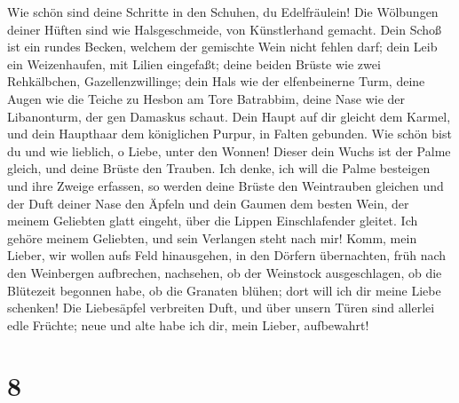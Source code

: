  Wie schön sind deine Schritte in den Schuhen, du
Edelfräulein! Die Wölbungen deiner Hüften sind wie Halsgeschmeide, von
Künstlerhand gemacht.  Dein Schoß ist ein rundes Becken,
welchem der gemischte Wein nicht fehlen darf; dein Leib ein
Weizenhaufen, mit Lilien eingefaßt;  deine beiden Brüste
wie zwei Rehkälbchen, Gazellenzwillinge;  dein Hals wie
der elfenbeinerne Turm, deine Augen wie die Teiche zu Hesbon am Tore
Batrabbim, deine Nase wie der Libanonturm, der gen Damaskus schaut.
 Dein Haupt auf dir gleicht dem Karmel, und dein Haupthaar
dem königlichen Purpur, in Falten gebunden.  Wie schön
bist du und wie lieblich, o Liebe, unter den Wonnen! 
Dieser dein Wuchs ist der Palme gleich, und deine Brüste den Trauben.
 Ich denke, ich will die Palme besteigen und ihre Zweige
erfassen, so werden deine Brüste den Weintrauben gleichen und der Duft
deiner Nase den Äpfeln  und dein Gaumen dem besten Wein,
der meinem Geliebten glatt eingeht, über die Lippen Einschlafender
gleitet.  Ich gehöre meinem Geliebten, und sein Verlangen
steht nach mir!  Komm, mein Lieber, wir wollen aufs Feld
hinausgehen, in den Dörfern übernachten,  früh nach den
Weinbergen aufbrechen, nachsehen, ob der Weinstock ausgeschlagen, ob die
Blütezeit begonnen habe, ob die Granaten blühen; dort will ich dir meine
Liebe schenken!  Die Liebesäpfel verbreiten Duft, und
über unsern Türen sind allerlei edle Früchte; neue und alte habe ich
dir, mein Lieber, aufbewahrt!

\hypertarget{section-7}{%
\section{8}\label{section-7}}

